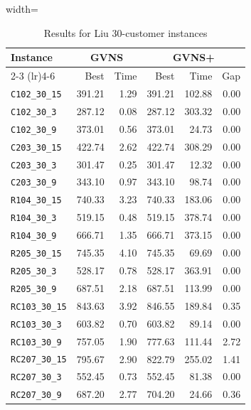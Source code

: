 ﻿\documentclass{article}
\begin{document}
\begin{table}[ht]
\centering
\small
\setlength{\tabcolsep}{3pt}
\caption{Results for Liu 30-customer instances}
\vspace{4mm}
\begin{adjustbox}{width=\textwidth}
\begin{tabular}{l r r @{\hspace{4pt}} r r r}
\toprule
\multirow{2}{*}{Instance} & \multicolumn{2}{c}{GVNS} & \multicolumn{3}{c}{GVNS+} \\
\cmidrule(lr){2-3} \cmidrule(lr){4-6}
 & Best & Time & Best & Time & Gap \\
\midrule
\texttt{C102\_30\_15} & 391.21 & 1.29 & 391.21 & 102.88 & 0.00 \\
\texttt{C102\_30\_3} & 287.12 & 0.08 & 287.12 & 303.32 & 0.00 \\
\texttt{C102\_30\_9} & 373.01 & 0.56 & 373.01 & 24.73 & 0.00 \\
\texttt{C203\_30\_15} & 422.74 & 2.62 & 422.74 & 308.29 & 0.00 \\
\texttt{C203\_30\_3} & 301.47 & 0.25 & 301.47 & 12.32 & 0.00 \\
\texttt{C203\_30\_9} & 343.10 & 0.97 & 343.10 & 98.74 & 0.00 \\
\texttt{R104\_30\_15} & 740.33 & 3.23 & 740.33 & 183.06 & 0.00 \\
\texttt{R104\_30\_3} & 519.15 & 0.48 & 519.15 & 378.74 & 0.00 \\
\texttt{R104\_30\_9} & 666.71 & 1.35 & 666.71 & 373.15 & 0.00 \\
\texttt{R205\_30\_15} & 745.35 & 4.10 & 745.35 & 69.69 & 0.00 \\
\texttt{R205\_30\_3} & 528.17 & 0.78 & 528.17 & 363.91 & 0.00 \\
\texttt{R205\_30\_9} & 687.51 & 2.18 & 687.51 & 113.99 & 0.00 \\
\texttt{RC103\_30\_15} & 843.63 & 3.92 & 846.55 & 189.84 & 0.35 \\
\texttt{RC103\_30\_3} & 603.82 & 0.70 & 603.82 & 89.14 & 0.00 \\
\texttt{RC103\_30\_9} & 757.05 & 1.90 & 777.63 & 111.44 & 2.72 \\
\texttt{RC207\_30\_15} & 795.67 & 2.90 & 822.79 & 255.02 & 1.41 \\
\texttt{RC207\_30\_3} & 552.45 & 0.73 & 552.45 & 81.38 & 0.00 \\
\texttt{RC207\_30\_9} & 687.20 & 2.77 & 704.20 & 24.66 & 0.36 \\
\bottomrule
\end{tabular}
\end{adjustbox}
\end{table}
\end{document}
